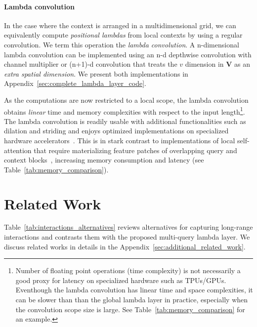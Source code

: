 \documentclass{article} \usepackage{iclr2021_conference,times}
\begin{document}
\vspace{-0.1cm}
\paragraph{Lambda convolution}
In the case where the context is arranged in a multidimensional grid, we can equivalently compute \emph{positional lambdas} from local contexts by using a regular convolution.
We term this operation the \emph{lambda convolution}.
A n-dimensional lambda convolution can be implemented using an n-d depthwise convolution with channel multiplier or (n+1)-d convolution that treats the $v$ dimension in $\boldsymbol{V}$ as an \emph{extra spatial dimension}.
We present both implementations in Appendix~\ref{sec:complete_lambda_layer_code}.

As the computations are now restricted to a local scope, the lambda convolution obtains \emph{linear} time and memory complexities with respect to the input length\footnote{Number of floating point operations (time complexity) is not necessarily a good proxy for latency on specialized hardware such as TPUs/GPUs. Eventhough the lambda convolution has linear time and space complexities, it can be slower than than the global lambda layer in practice, especially when the convolution scope size is large. See Table~\ref{tab:memory_comparison} for an example.}.
The lambda convolution is readily usable with additional functionalities such as dilation and striding and enjoys optimized implementations on specialized hardware accelerators~\citep{nickolls2010gpu,jouppiTPU}.
This is in stark contrast to implementations of local self-attention that require materializing feature patches of overlapping query and context blocks~\citep{parmar2018image,ramachandran2019sasa}, increasing memory consumption and latency (see Table~\ref{tab:memory_comparison}). \section{Related Work\label{sec:related_work}}
Table~\ref{tab:interactions_alternatives} reviews alternatives for capturing long-range interactions and contrasts them with the proposed multi-query lambda layer.
We discuss related works in details in the Appendix~\ref{sec:additional_related_work}.

\vspace{-0.15cm}
\end{document}
